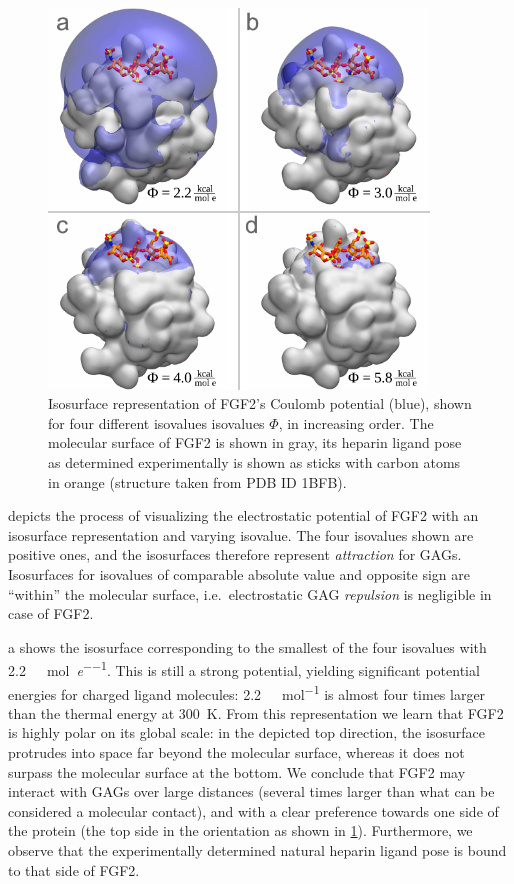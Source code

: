 \begin{figure}
\centering
\includegraphics[width=0.9\textwidth]{gfx/bspred/fgf2_coulomb_isosurfaces_different_values_03_ds.pdf}
\caption[]{
Isosurface representation of FGF2's Coulomb potential (blue), shown for four
different isovalues isovalues $\Phi$, in increasing order. The molecular surface
of FGF2 is shown in gray, its heparin ligand pose as determined experimentally
is shown as sticks with carbon atoms in orange (structure taken from PDB ID
1BFB).}
\label{fig:bspred:fgf2_multi_iso}
\end{figure}

 depicts the process of visualizing the
electrostatic potential of FGF2 with an isosurface representation and varying
isovalue. The four isovalues shown are positive ones, and the isosurfaces
therefore represent \textit{attraction} for GAGs. Isosurfaces for isovalues of
comparable absolute value and opposite sign are \enquote{within} the molecular
surface, i.e.\ electrostatic GAG \textit{repulsion} is negligible in case of
FGF2.

a shows the isosurface corresponding to the
smallest of the four isovalues with
\SI{2.2}{\kilo\calory\per\mole\per\elementarycharge}. This is still a strong
potential, yielding significant potential energies for charged ligand molecules:
\SI{2.2}{\kilo\calory\per\mole} is almost four times larger than the thermal
energy at \SI{300}{\kelvin}. From this representation we learn that FGF2 is
highly polar on its global scale: in the depicted top direction, the isosurface
protrudes into space far beyond the molecular surface, whereas it does not
surpass the molecular surface at the bottom. We conclude that FGF2 may interact
with GAGs over large distances (several times larger than what can be
considered a molecular contact), and with a clear preference towards one side
of the protein (the top side in the orientation as shown in
\cref{fig:bspred:fgf2_multi_iso}). Furthermore, we observe that the
experimentally determined natural heparin ligand pose is bound to that side of
FGF2.

